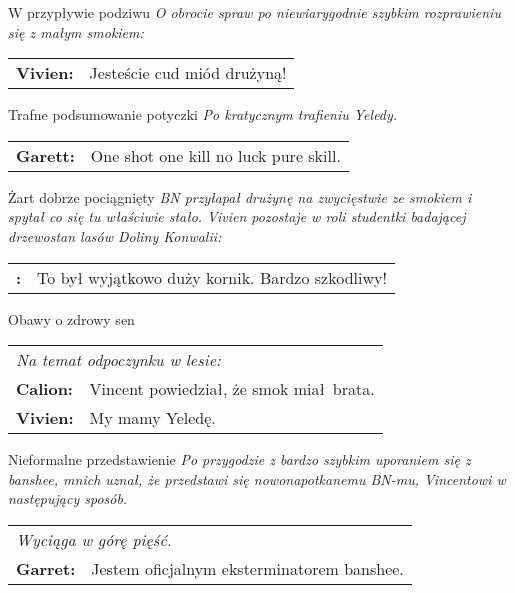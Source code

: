 \documentclass[10pt,twoside,twocolumn]{book}
\begin{document}
\begin{rpg-quotebox}{W przypływie podziwu}
   \textit{O obrocie spraw po niewiarygodnie szybkim rozprawieniu się z małym smokiem:} \\
   
   \begin{tabularx}{\columnwidth}{lX}
      \textbf{Vivien:} & Jesteście cud miód drużyną!\\
   \end{tabularx}
\end{rpg-quotebox}


\begin{rpg-quotebox}{Trafne podsumowanie potyczki}
   \textit{Po kratycznym trafieniu Yeledy.}\\

   \begin{tabularx}{\columnwidth}{lX}
      \textbf{Garett:} & One shot one kill no luck pure skill.\\
   \end{tabularx}
\end{rpg-quotebox}


\begin{rpg-quotebox}{Żart dobrze pociągnięty}
   \textit{BN przyłapał drużynę na zwycięstwie ze smokiem i spytał co się tu właściwie stało. Vivien pozostaje w roli studentki badającej drzewostan lasów Doliny Konwalii:} \\

   \begin{tabularx}{\columnwidth}{lX}
      \textbf{:} & To był wyjątkowo duży kornik. Bardzo szkodliwy!\\
   \end{tabularx}
\end{rpg-quotebox}


\begin{rpg-quotebox}{Obawy o zdrowy sen}
   \begin{tabularx}{\columnwidth}{lX}
      \multicolumn{2}{l}{\textit{Na temat odpoczynku w lesie:}} \\
      \textbf{Calion:} & Vincent powiedział, że smok miał brata.\\
      \textbf{Vivien:} & My mamy Yeledę.
   \end{tabularx}
\end{rpg-quotebox}


\begin{rpg-quotebox}{Nieformalne przedstawienie}
   \textit{Po przygodzie z bardzo szybkim uporaniem się z banshee, mnich uznał, że przedstawi się nowonapotkanemu BN-mu, Vincentowi w następujący sposób.}\\

   \begin{tabularx}{\columnwidth}{lX}
      \multicolumn{2}{l}{\textit{Wyciąga w górę pięść.}}\\
      \textbf{Garret:} & Jestem oficjalnym eksterminatorem banshee. \\
   \end{tabularx}
\end{rpg-quotebox}
\end{document}

